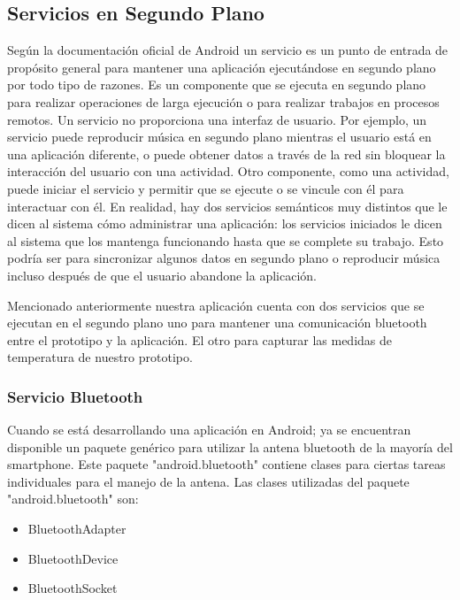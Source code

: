 \subsection{Servicios en Segundo Plano}

\par 
Según la documentación oficial de Android un servicio es un punto de entrada de propósito general para mantener una aplicación ejecutándose en segundo plano por todo tipo de razones. Es un componente que se ejecuta en segundo plano para realizar operaciones de larga ejecución o para realizar trabajos en procesos remotos. Un servicio no proporciona una interfaz de usuario. Por ejemplo, un servicio puede reproducir música en segundo plano mientras el usuario está en una aplicación diferente, o puede obtener datos a través de la red sin bloquear la interacción del usuario con una actividad. Otro componente, como una actividad, puede iniciar el servicio y permitir que se ejecute o se vincule con él para interactuar con él. En realidad, hay dos servicios semánticos muy distintos que le dicen al sistema cómo administrar una aplicación: los servicios iniciados le dicen al sistema que los mantenga funcionando hasta que se complete su trabajo. Esto podría ser para sincronizar algunos datos en segundo plano o reproducir música incluso después de que el usuario abandone la aplicación.\cite{androidapp}

\par \noindent
Mencionado anteriormente nuestra aplicación cuenta con dos servicios que se ejecutan en el segundo plano uno para mantener una comunicación bluetooth entre el prototipo y la aplicación. El otro para capturar las medidas de temperatura de nuestro prototipo. 

\subsubsection{Servicio Bluetooth}

\par \noindent
Cuando se está desarrollando una aplicación en Android; ya se encuentran disponible un paquete genérico para utilizar la antena bluetooth de la mayoría del smartphone. Este paquete "android.bluetooth" contiene clases para ciertas tareas individuales para el manejo de la antena. Las clases utilizadas del paquete "android.bluetooth" son:

\begin{itemize}
	\item BluetoothAdapter
	
	\item BluetoothDevice
	
	\item BluetoothSocket
\end{itemize}

